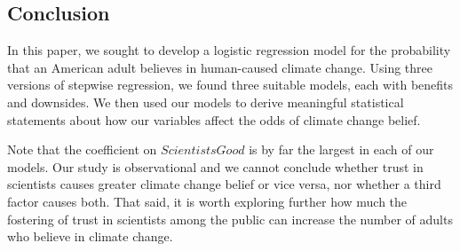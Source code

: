 \subsection{Conclusion}

\par In this paper, we sought to develop a logistic regression model for the probability that an American adult believes in human-caused climate change. Using three versions of stepwise regression, we found three suitable models, each with benefits and downsides. We then used our models to derive meaningful statistical statements about how our variables affect the odds of climate change belief.

\par \bigskip Note that the coefficient on $ScientistsGood$ is by far the largest in each of our models. Our study is observational and we cannot conclude whether trust in scientists causes greater climate change belief or vice versa, nor whether a third factor causes both. That said, it is worth exploring further how much the fostering of trust in scientists among the public can increase the number of adults who believe in climate change.